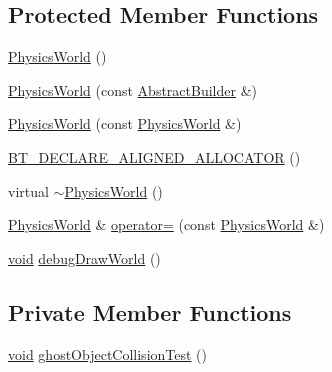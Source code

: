\subsection*{Protected Member Functions}
\begin{DoxyCompactItemize}
\item 
\mbox{\hyperlink{classnjli_1_1_physics_world_a64f4e12a96831a18cf568fb338193379}{Physics\+World}} ()
\item 
\mbox{\hyperlink{classnjli_1_1_physics_world_a11c079e930dfb8d4d5e7834b22f2d3ee}{Physics\+World}} (const \mbox{\hyperlink{classnjli_1_1_abstract_builder}{Abstract\+Builder}} \&)
\item 
\mbox{\hyperlink{classnjli_1_1_physics_world_aaa5561b67b4b8ddd1e71b26e1f9e9cb7}{Physics\+World}} (const \mbox{\hyperlink{classnjli_1_1_physics_world}{Physics\+World}} \&)
\item 
\mbox{\hyperlink{classnjli_1_1_physics_world_a92c908a89e5d1b8f061bf706ee3df631}{B\+T\+\_\+\+D\+E\+C\+L\+A\+R\+E\+\_\+\+A\+L\+I\+G\+N\+E\+D\+\_\+\+A\+L\+L\+O\+C\+A\+T\+OR}} ()
\item 
virtual \mbox{\hyperlink{classnjli_1_1_physics_world_ae2f4d16a40aaaf5b65d091861c5069ff}{$\sim$\+Physics\+World}} ()
\item 
\mbox{\hyperlink{classnjli_1_1_physics_world}{Physics\+World}} \& \mbox{\hyperlink{classnjli_1_1_physics_world_ac324be9f6e37e0057c461202203863d2}{operator=}} (const \mbox{\hyperlink{classnjli_1_1_physics_world}{Physics\+World}} \&)
\item 
\mbox{\hyperlink{_thread_8h_af1e856da2e658414cb2456cb6f7ebc66}{void}} \mbox{\hyperlink{classnjli_1_1_physics_world_a5e3b0fcf00fc8a8151510c86088c034f}{debug\+Draw\+World}} ()
\end{DoxyCompactItemize}
\subsection*{Private Member Functions}
\begin{DoxyCompactItemize}
\item 
\mbox{\hyperlink{_thread_8h_af1e856da2e658414cb2456cb6f7ebc66}{void}} \mbox{\hyperlink{classnjli_1_1_physics_world_ae6873032c9a97589b406c69f33383fdb}{ghost\+Object\+Collision\+Test}} ()
\end{DoxyCompactItemize}
